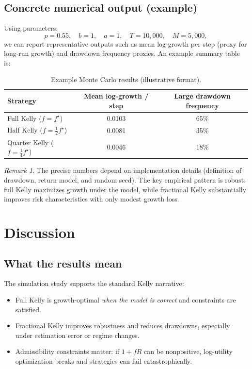 \documentclass[11pt]{article}
\theoremstyle{plain}
\theoremstyle{definition}
\theoremstyle{remark}
\newtheorem{remark}[theorem]{Remark}
\newcommand{\1}{\mathbf{1}}
\begin{document}
\subsection{Concrete numerical output (example)}
Using parameters:
\[
p=0.55,\quad b=1,\quad a=1,\quad T=10{,}000,\quad M=5{,}000,
\]
we can report representative outputs such as mean log-growth per step (proxy for long-run growth) and drawdown frequency proxies. An example summary table is:

\begin{table}[h!]
\centering
\caption{Example Monte Carlo results (illustrative format).}
\label{tab:kelly_results}
\begin{tabular}{lcc}
\toprule
\textbf{Strategy} & \textbf{Mean log-growth / step} & \textbf{Large drawdown frequency} \\
\midrule
Full Kelly ($f=f^\star$)        & 0.0103 & 65\% \\
Half Kelly ($f=\tfrac12 f^\star$)   & 0.0081 & 35\% \\
Quarter Kelly ($f=\tfrac14 f^\star$) & 0.0046 & 18\% \\
\bottomrule
\end{tabular}
\end{table}

\begin{remark}
The precise numbers depend on implementation details (definition of drawdown, return model, and random seed). The key empirical pattern is robust: full Kelly maximizes growth under the model, while fractional Kelly substantially improves risk characteristics with only modest growth loss.
\end{remark}

\section{Discussion}
\subsection{What the results mean}
The simulation study supports the standard Kelly narrative:
\begin{itemize}
\item Full Kelly is growth-optimal \emph{when the model is correct} and constraints are satisfied.
\item Fractional Kelly improves robustness and reduces drawdowns, especially under estimation error or regime changes.
\item Admissibility constraints matter: if $1+fR$ can be nonpositive, log-utility optimization breaks and strategies can fail catastrophically.
\end{itemize}
\end{document}
